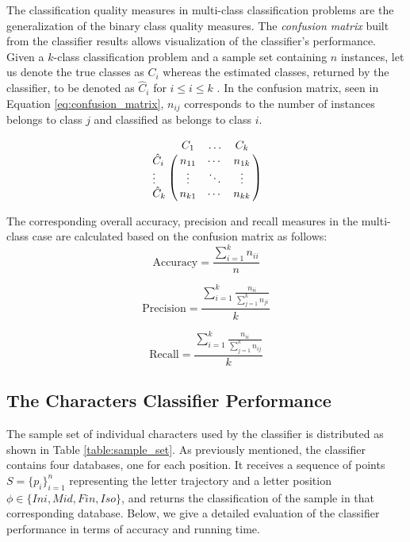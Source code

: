 \iftoggle{edit-mode}{\hspace{0pt}\marginpar{Classification quality measurements - multi-class}}{}
The classification quality measures in multi-class classification problems are the generalization of the binary class quality measures.
The \emph{confusion matrix} built from the classifier results allows visualization of the classifier's performance. 
Given a $k$-class classification problem and a sample set containing $n$ instances, let us denote the true classes as $C_i$ whereas the estimated classes, returned by the classifier, to be denoted as $\hat{C}_i$ for $i\leq i \leq k$ \cite{sokolova2009systematic, labatut2012accuracy}.
In the confusion matrix, seen in Equation \ref{eq:confusion_matrix}, $n_{ij}$ corresponds to the number of instances belongs to class $j$ and classified as belongs to class $i$.

\begin{equation}
\bordermatrix{ & C_1& \ldots &C_k \cr 
  \hat{C}_i & n_{11} & \cdots & n_{1k} \cr
  \vdots    & \vdots & \ddots & \vdots \cr
  \hat{C}_k & n_{k1} & \cdots & n_{kk}}
\label{eq:confusion_matrix} 
\end{equation}

The corresponding overall accuracy, precision and recall measures in the multi-class case are calculated based on the confusion matrix as follows:
\begin{equation}
\text{Accuracy}=\frac{\sum\limits_{i=1}^{k} n_{ii}}{n}
\label{eq:accuracy}
\end{equation}

\begin{equation}
\text{Precision}=\frac{\sum\limits_{i=1}^{k} \frac{n_{ii}}{\sum_{j=1}^{k} n_{ji}}}{k}
\label{eq:percision}
\end{equation}

\begin{equation}
\text{Recall}=   \frac{\sum\limits_{i=1}^{k} \frac{n_{ii}}{\sum_{j=1}^{k} n_{ij}}}{k}
\label{eq:percision}
\end{equation}

\subsection{The Characters Classifier Performance}
\iftoggle{edit-mode}{\hspace{0pt}\marginpar{The sample set}}{}
The sample set of individual characters used by the classifier is distributed as shown in Table \ref{table:sample_set}.
As previously mentioned, the classifier contains four databases, one for each position. 
It receives a sequence of points $S=\{p_{i}\}_{i=1}^{n}$ representing the letter trajectory and a letter position $\phi \in \{Ini, Mid, Fin, Iso\}$, and returns the classification of the sample in that corresponding database.
Below, we give a detailed evaluation of the classifier performance in terms of accuracy and running time.

